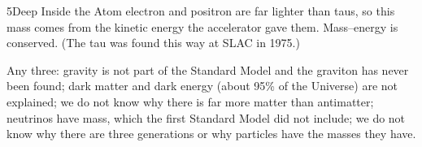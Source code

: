 \begin{chapteranswers}{5}{Deep Inside the Atom}
        electron and positron are far lighter than taus, so this mass comes from the
        kinetic energy the accelerator gave them. Mass--energy is conserved. (The tau was
        found this way at SLAC in 1975.)
  \item Any three: gravity is not part of the Standard Model and the graviton has never
        been found; dark matter and dark energy (about 95\% of the Universe) are not
        explained; we do not know why there is far more matter than antimatter; neutrinos
        have mass, which the first Standard Model did not include; we do not know why there
        are three generations or why particles have the masses they have.
\end{chapteranswers}
